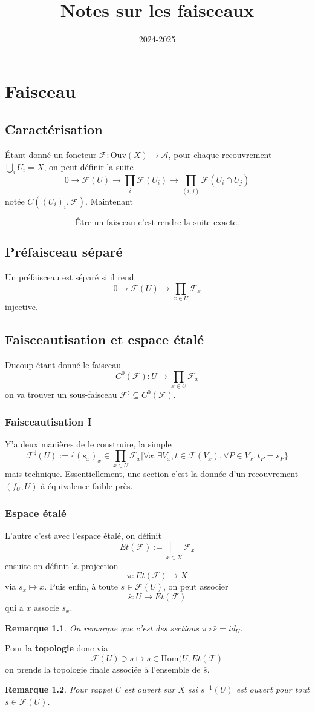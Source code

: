 \documentclass[a4paper,12pt]{book}
\title{Notes sur les faisceaux}
\date{2024-2025}
\newcommand{\Aat}{\mathcal{A}}
\newcommand{\F}{\mathscr F}
\newcommand{\Hom}{\textrm{Hom}}
\newcommand{\Ouv}{\textrm{Ouv}}
\theoremstyle{plain}
\newtheorem{rem}{Remarque}
\theoremstyle{definition}
\theoremstyle{remark}
\begin{document}
\maketitle
\tableofcontents

\chapter{Faisceau}

\section{Caractérisation}

Étant donné un foncteur $\F\colon \Ouv(X)\to \Aat$, pour chaque 
recouvrement $\bigcup_i U_i = X$, on peut définir la suite
\[0\to\F(U)\to\prod_i \F(U_i)\to\prod_{(i,j)}\F(U_i\cap U_j)\]
notée $C((U_i)_i,\F)$. Maintenant 

\[\textrm{Être un faisceau c'est rendre
la suite exacte.}\]


\section{Préfaisceau séparé}
Un préfaisceau est séparé si il rend 
\[0\to \F(U)\to \prod_{x\in U} \F_x\]
injective.

\section{Faisceautisation et espace étalé}
Ducoup étant donné le faisceau
\[C^0(\F)\colon U\mapsto \prod_{x\in U} \F_x\]
on va trouver un sous-faisceau $\F^\sharp\subseteq C^0(\F)$.
\subsection{Faisceautisation I}
Y'a deux manières de le construire, la simple
\[\F^\sharp(U):=\{(s_x)_x\in \prod_{x\in U} \F_x|\forall x, \exists V_x,
t\in\F(V_x),\forall P\in V_x,t_P=s_P\}\]
mais technique. Essentiellement, une section c'est la donnée d'un
recouvrement $(f_U, U)$ à équivalence faible près.
\subsection{Espace étalé}
L'autre c'est avec l'espace étalé, on définit 
\[Et(\F):=\bigsqcup_{x\in X} \F_x\]
ensuite on définit la projection 
\[\pi \colon Et(\F)\to X\]
via $s_x\mapsto x$. Puis enfin, à toute $s\in \F(U)$, on peut associer
\[\bar s\colon U\to Et(\F)\]
qui a $x$ associe $s_x$.
\begin{rem}
  On remarque que c'est des sections
$\pi\circ\bar s=id_U$. 
\end{rem}
Pour la \textbf{topologie} donc via 
\[\F(U)\ni s\mapsto \bar s\in \Hom(U, Et(\F)\]
on prends la topologie finale associée à l'ensemble de $\bar s$.
\begin{rem}
  Pour rappel $U$ est ouvert sur $X$ ssi $\bar s^{-1}(U)$ est ouvert
  pour tout $s\in \F(U)$.
\end{rem}
\end{document}
